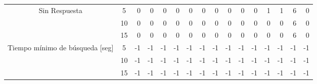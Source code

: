 \begin{sidewaystable}
\begin{tabular}{@{}ccc|rrrrrrrrrrrrrr@{}}
\midrule
\multicolumn{2}{c}{\multirow{3}{*}{Sin Respuesta}}            & 5                    & 0                      & 0                      & 0                      & 0                      & 0                      & 0                      & 0                      & 0                      & 0                      & 0                      & 1                      & 1                      & 6                      & 0                      \\
\multicolumn{2}{c}{}                                               & 10                   & 0                      & 0                      & 0                      & 0                      & 0                      & 0                      & 0                      & 0                      & 0                      & 0                      & 0                      & 0                      & 6                      & 0                      \\
\multicolumn{2}{c}{}                                               & 15                   & 0                      & 0                      & 0                      & 0                      & 0                      & 0                      & 0                      & 0                      & 0                      & 0                      & 0                      & 0                      & 6                      & 0                      \\
\midrule
\multicolumn{2}{c}{\multirow{3}{*}{Tiempo mínimo de búsqueda {[}seg{]}}}     & 5                    & -1                     & -1                     & -1                     & -1                     & -1                     & -1                     & -1                     & -1                     & -1                     & -1                     & -1                     & -1                     & -1                     & -1                     \\
\multicolumn{2}{c}{}                                               & 10                   & -1                     & -1                     & -1                     & -1                     & -1                     & -1                     & -1                     & -1                     & -1                     & -1                     & -1                     & -1                     & -1                     & -1                     \\
\multicolumn{2}{c}{}                                               & 15                   & -1                     & -1                     & -1                     & -1                     & -1                     & -1                     & -1                     & -1                     & -1                     & -1                     & -1                     & -1                     & -1                     & -1                     \\

\end{tabular}
\end{sidewaystable}
